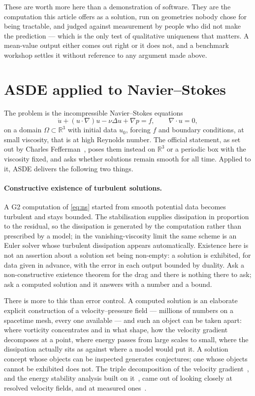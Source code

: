 \documentclass[11pt]{article}
\newcommand{\grad}{\nabla}
\begin{document}
These are worth more here than a demonstration of software. They are the computation this article
offers as a solution, run on geometries nobody chose for being tractable, and judged against
measurement by people who did not make the prediction --- which is the only test of qualitative
uniqueness that matters. A mean-value output either comes out right or it does not, and a benchmark
workshop settles it without reference to any argument made above.


\section{ASDE applied to Navier--Stokes}\label{sec:ns}

The problem is the incompressible Navier--Stokes equations
\begin{equation}\label{eq:ns}
\dot u + (u\cdot\grad)u - \nu\Delta u + \grad p = f,\qquad \grad\cdot u = 0,
\end{equation}
on a domain $\Omega\subset\mathbb{R}^3$ with initial data $u_0$, forcing $f$ and boundary
conditions, at small viscosity, that is at high Reynolds number. The official statement, as set out
by Charles Fefferman~\cite{fefferman}, poses them instead on $\mathbb{R}^3$ or a periodic box with
the viscosity fixed, and asks whether solutions remain smooth for all time. Applied to it, ASDE delivers the
following two things.

\paragraph{Constructive existence of turbulent solutions.} A G2 computation of \eqref{eq:ns}
started from smooth potential data becomes turbulent and stays bounded. The stabilisation supplies
dissipation in proportion to the residual, so the dissipation is generated by the computation
rather than prescribed by a model; in the vanishing-viscosity limit the same scheme is an Euler
solver whose turbulent dissipation appears automatically. Existence here is not an assertion about
a solution set being non-empty: a solution is exhibited, for data given in advance, with the error
in each output bounded by duality. Ask a non-constructive existence theorem for the drag
and there is nothing there to ask; ask a computed solution and it answers with a number and a bound.

There is more to this than error control. A computed solution is an elaborate explicit construction
of a velocity--pressure field --- millions of numbers on a spacetime mesh, every one available ---
and such an object can be taken apart: where vorticity concentrates and in what shape, how the
velocity gradient decomposes at a point, where energy passes from large scales to small, where the
dissipation actually sits as against where a model would put it. A solution concept whose objects
can be inspected generates conjectures; one whose objects cannot be exhibited does not. The triple
decomposition of the velocity gradient~\cite{triple}, and the energy stability analysis built on
it~\cite{energystab}, came out of looking closely at resolved velocity fields, and at measured
ones~\cite{musci}.
\end{document}
